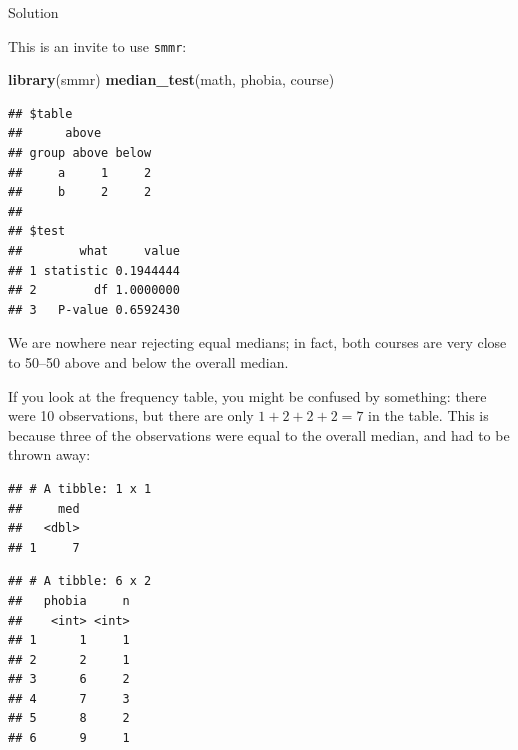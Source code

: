 \documentclass[]{tufte-book}
\newenvironment{Shaded}{}{}
\newcommand{\DataTypeTok}[1]{\textcolor[rgb]{0.56,0.13,0.00}{#1}}
\newcommand{\KeywordTok}[1]{\textcolor[rgb]{0.00,0.44,0.13}{\textbf{#1}}}
\newcommand{\NormalTok}[1]{#1}
\newcommand{\OperatorTok}[1]{\textcolor[rgb]{0.40,0.40,0.40}{#1}}
\newcommand{\StringTok}[1]{\textcolor[rgb]{0.25,0.44,0.63}{#1}}
\theoremstyle{definition}
\theoremstyle{definition}
\theoremstyle{definition}
\theoremstyle{remark}
\begin{document}
Solution

This is an invite to use \texttt{smmr}:

\begin{Shaded}
\begin{Highlighting}[]
\KeywordTok{library}\NormalTok{(smmr)}
\KeywordTok{median_test}\NormalTok{(math, phobia, course)}
\end{Highlighting}
\end{Shaded}

\begin{verbatim}
## $table
##      above
## group above below
##     a     1     2
##     b     2     2
## 
## $test
##        what     value
## 1 statistic 0.1944444
## 2        df 1.0000000
## 3   P-value 0.6592430
\end{verbatim}

We are nowhere near rejecting equal medians; in fact, both courses are
very close to 50--50 above and below the overall median.

If you look at the frequency table, you might be confused by something:
there were 10 observations, but there are only \(1+2+2+2=7\) in the
table. This is because three of the observations were equal to the
overall median, and had to be thrown away:

\begin{Shaded}
\end{Shaded}

\begin{verbatim}
## # A tibble: 1 x 1
##     med
##   <dbl>
## 1     7
\end{verbatim}

\begin{Shaded}
\end{Shaded}

\begin{verbatim}
## # A tibble: 6 x 2
##   phobia     n
##    <int> <int>
## 1      1     1
## 2      2     1
## 3      6     2
## 4      7     3
## 5      8     2
## 6      9     1
\end{verbatim}
\end{document}
